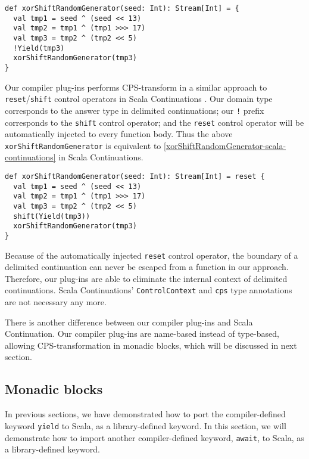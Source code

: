 \begin{lstlisting}[caption={TheXorshift pseudo-random number generator,  in the style of !-notation},label={xorShiftRandomGenerator-bang}]
def xorShiftRandomGenerator(seed: Int): Stream[Int] = {
  val tmp1 = seed ^ (seed << 13)
  val tmp2 = tmp1 ^ (tmp1 >>> 17)
  val tmp3 = tmp2 ^ (tmp2 << 5)
  !Yield(tmp3)
  xorShiftRandomGenerator(tmp3)
}
\end{lstlisting}

Our compiler plug-ins performs CPS-transform in a similar approach to \lstinline{reset}/\lstinline{shift} control operators in Scala Continuations \cite{rompf2009implementing}. Our domain type corresponds to the answer type in delimited continuations; our \lstinline{!} prefix corresponds to the \lstinline{shift} control operator; and the \lstinline{reset} control operator will be automatically injected to every function body. Thus the above \lstinline{xorShiftRandomGenerator} is equivalent to \cref{xorShiftRandomGenerator-scala-continuations} in Scala Continuations.

\begin{lstlisting}[caption={TheXorshift pseudo-random number generator,  in Scala Continuations},label={xorShiftRandomGenerator-scala-continuations}]
def xorShiftRandomGenerator(seed: Int): Stream[Int] = reset {
  val tmp1 = seed ^ (seed << 13)
  val tmp2 = tmp1 ^ (tmp1 >>> 17)
  val tmp3 = tmp2 ^ (tmp2 << 5)
  shift(Yield(tmp3))
  xorShiftRandomGenerator(tmp3)
}
\end{lstlisting}

Because of the automatically injected \lstinline{reset} control operator, the boundary of a delimited continuation can never be escaped from a function in our approach. Therefore, our plug-ins are able to eliminate the internal context of delimited continuations. Scala Continuations' \lstinline{ControlContext} and \lstinline{cps} type annotations are not necessary any more.

There is another difference between our compiler plug-ins and Scala Continuation. Our compiler plug-ins are name-based instead of type-based, allowing CPS-transformation in monadic blocks, which will be discussed in next section.

\subsection{Monadic blocks}\label{Monadic blocks}

In previous sections, we have demonstrated how to port the compiler-defined keyword \lstinline{yield} to Scala, as a library-defined keyword. In this section, we will demonstrate how to import another compiler-defined keyword, \lstinline{await}, to Scala, as a library-defined keyword.


